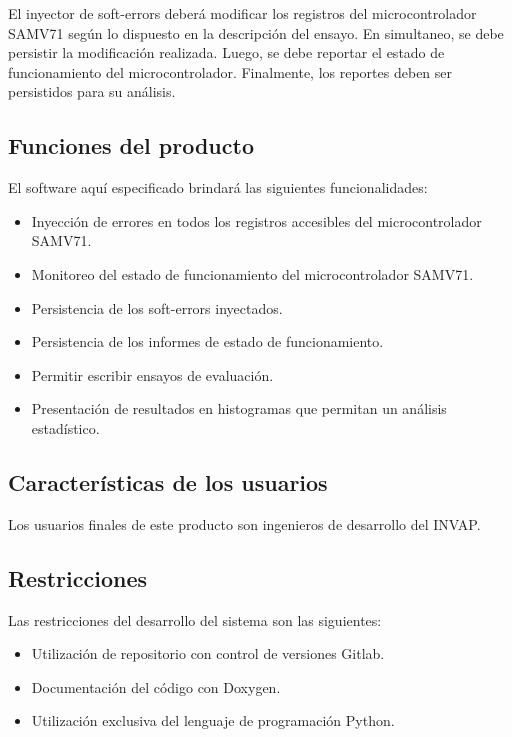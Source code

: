 \documentclass[
11pt, %
codirector, %
]{charter}
\begin{document}
El inyector de soft-errors deberá modificar los registros del microcontrolador SAMV71 según lo dispuesto en la descripción del ensayo.
En simultaneo, se debe persistir la modificación realizada.
Luego, se debe reportar el estado de funcionamiento del microcontrolador.
Finalmente, los reportes deben ser persistidos para su análisis.

\subsection{Funciones del producto}

El software aquí especificado brindará las siguientes funcionalidades:

\begin{itemize}
	\item Inyección de errores en todos los registros accesibles del microcontrolador SAMV71.
	\item Monitoreo del estado de funcionamiento del microcontrolador SAMV71.
	\item Persistencia de los soft-errors inyectados.
	\item Persistencia de los informes de estado de funcionamiento.
	\item Permitir escribir ensayos de evaluación.
	\item Presentación de resultados en histogramas que permitan un análisis estadístico.
\end{itemize}

\subsection{Características de los usuarios}

Los usuarios finales de este producto son ingenieros de desarrollo del INVAP.

\subsection{Restricciones}

Las restricciones del desarrollo del sistema son las siguientes:

\begin{itemize}
	\item Utilización de repositorio con control de versiones Gitlab.
	\item Documentación del código con Doxygen.
	\item Utilización exclusiva del lenguaje de programación Python.
\end{itemize}
\end{document}

